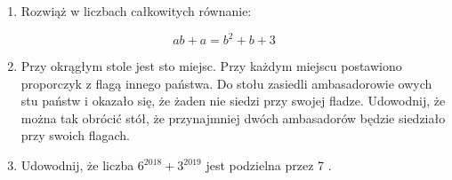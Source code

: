 \documentclass[10pt]{article}
\begin{document}
\begin{enumerate}
  \item Rozwiąż w liczbach całkowitych równanie:
\end{enumerate}

\[
a b+a=b^{2}+b+3
\]

\begin{enumerate}
  \setcounter{enumi}{1}
  \item Przy okrągłym stole jest sto miejsc. Przy każdym miejscu postawiono proporczyk z flagą innego państwa. Do stołu zasiedli ambasadorowie owych stu państw i okazało się, że żaden nie siedzi przy swojej fladze. Udowodnij, że można tak obrócić stół, że przynajmniej dwóch ambasadorów będzie siedziało przy swoich flagach.
  \item Udowodnij, że liczba \(6^{2018}+3^{2019}\) jest podzielna przez 7 .
\end{enumerate}
\end{document}
